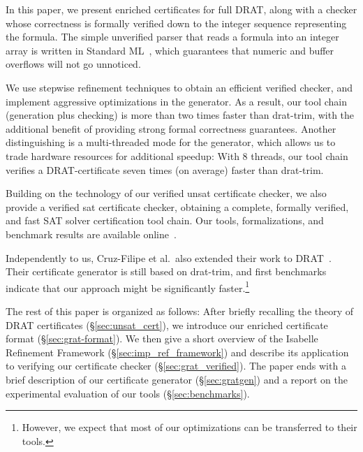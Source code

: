 \documentclass[smallcondensed]{svjour3}     %
\begin{document}
In this paper, we present enriched certificates for full DRAT, along with a checker whose correctness is formally verified down to the integer sequence 
representing the formula. 
The simple unverified parser that reads a formula into an integer array is written in Standard ML~\cite{MHMT97}, which guarantees that numeric and buffer overflows will 
not go unnoticed.

We use stepwise refinement techniques to obtain an efficient verified checker, and implement aggressive optimizations in the generator.
As a result, our tool chain (generation plus checking) is more than two times faster than drat-trim, with the additional benefit 
of providing strong formal correctness guarantees.
Another distinguishing is a multi-threaded mode for the generator, which allows us to trade hardware resources for additional speedup:
With 8 threads, our tool chain verifies a DRAT-certificate seven times (on average) faster than drat-trim.

Building on the technology of our verified unsat certificate checker, we also provide a verified sat certificate checker, 
obtaining a complete, formally verified, and fast SAT solver certification tool chain. 
Our tools, formalizations, and benchmark results are available online~\cite{GRAT-homepage}.

Independently to us, Cruz-Filipe et al.\ also extended their work to DRAT~\cite{CHHKS17}. 
Their certificate generator is still based on drat-trim, and first benchmarks indicate that
our approach might be significantly faster.\footnote{However, we expect that most of our optimizations can be transferred to their tools.}


The rest of this paper is organized as follows: 
After briefly recalling the theory of DRAT certificates (\S\ref{sec:unsat_cert}), we introduce our enriched certificate format (\S\ref{sec:grat-format}).
We then give a short overview of the Isabelle Refinement Framework (\S\ref{sec:imp_ref_framework})
and describe its application to verifying our certificate checker (\S\ref{sec:grat_verified}). 
The paper ends with a brief description of our certificate generator (\S\ref{sec:gratgen}) and a report on the experimental evaluation 
of our tools (\S\ref{sec:benchmarks}).
\end{document}

